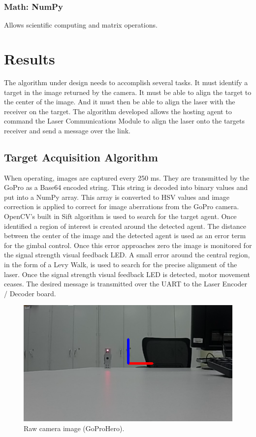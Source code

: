 \documentclass[botnum, fleqn]{unmeethesis}
\begin{document}
\subsubsection{Math: NumPy}
Allows scientific computing and matrix operations.

\section*{Results}

The algorithm under design needs to accomplish several tasks. It must identify a target in the image returned by the camera. It must be able to align the target to the center of the image. And it must then be able to align the laser with the receiver on the target. The algorithm developed allows the hosting agent to command the Laser Communications Module to align the laser onto the targets receiver and send a message over the link.

\subsection*{Target Acquisition Algorithm}

When operating, images are captured every 250 ms. They are transmitted by the GoPro as a Base64 encoded string. This string is decoded into binary values and put into a NumPy array. This array is converted to HSV values and image correction is applied to correct for image aberrations from the GoPro camera. OpenCV's built in Sift algorithm is used to search for the target agent. Once identified a region of interest is created around the detected agent. The distance between the center of the image and the detected agent is used as an error term for the gimbal control. Once this error approaches zero the image is monitored for the signal strength visual feedback LED. A small error around the central region, in the form of a Levy Walk, is used to search for the precise alignment of the laser. Once the signal strength visual feedback LED is detected, motor movement ceases. The desired message is transmitted over the UART to the Laser Encoder / Decoder board. 

\begin{figure}[ht]
 \begin{center}
  \includegraphics[width=0.5 \textwidth]{figures/frame.png}
  \caption{\small \label{fig:frame} Raw camera image (GoProHero).}
 \end{center}
\end{figure}
\end{document}
